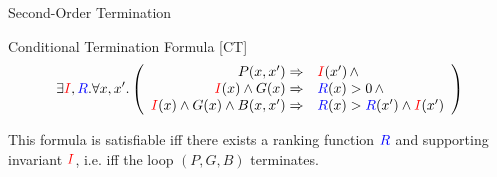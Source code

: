 \documentclass[xcolor=pdftex,t,11pt]{beamer}
\newcommand{\red}[1]{\textcolor{red}{#1}}
\newcommand{\blue}[1]{\textcolor{blue}{#1}}
\begin{document}
% 
% 



\begin{frame}{Second-Order Termination}

\begin{block}{Conditional Termination Formula [CT]}
 \[
 \exists \red{I}, \blue{R} .  \forall x, x' . \left ( \begin{array}{rl}
   P(x, x') \Rightarrow & \red{I}(x') \, \wedge \\
   \red{I}(x) \wedge G(x) \Rightarrow & \blue{R}(x) > 0 \, \wedge \\
   \red{I}(x) \wedge G(x) \wedge B(x, x') \Rightarrow & \blue{R}(x) > \blue{R}(x') \wedge \red{I}(x')
   \end{array} \right )
 \]
 \end{block}

 \vspace{1em}

This formula is satisfiable iff there exists a ranking function $\blue{R}$ and supporting invariant $\red{I}$,
i.e. iff the loop $(P, G, B)$ terminates.
 
\end{frame}
\end{document}
